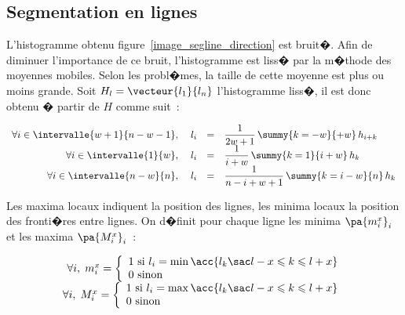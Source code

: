 \subsection{Segmentation en lignes}\label{section_segmentation_ligne}


L'histogramme obtenu figure~\ref{image_segline_direction} est bruit�. Afin de diminuer l'importance de ce bruit, l'histogramme est liss� par la m�thode des moyennes mobiles. Selon les probl�mes, la taille de cette moyenne est plus ou moins grande. Soit $H_l = \vecteur{l_1}{l_n}$ l'histogramme liss�, il est donc obtenu � partir de $H$ comme suit~:


            \begin{eqnarray}
            \begin{array}{rrcl}
            \forall i \in \intervalle{w+1}{n-w-1},     \; &     l_i &=& \dfrac{1}{2w+1} \, \summy{k=-w}{+w} \, h_{i+k} \\
            \forall i \in \intervalle{1}{w},                 \; &     l_i &=& \dfrac{1}{i+w} \, \summy{k=1}{i+w} \, h_k \\
            \forall i \in \intervalle{n-w}{n},             \; &     l_i &=& \dfrac{1}{n-i+ w + 1} \, \summy{k=i-w}{n} \, h_k 
            \end{array}
            \label{image_lissage_equation}
            \end{eqnarray}


Les maxima locaux indiquent la position des lignes, les minima locaux la position des fronti�res entre lignes. On d�finit pour chaque ligne les minima $\pa{m_i^x}_i$ et les maxima $\pa{M_i^x}_i$~:


            $$
            \begin{array}{rcl}
            \forall i, \; m_i^x = \left\{ \begin{array}{l}
                                                                        1 \text{ si } l_i = \min \acc { l_k \sac l-x \leqslant k \leqslant l+x } \\
                                                                        0 \text{ sinon}
                                                                    \end{array} \right. \\
            \forall i, \; M_i^x = \left\{ \begin{array}{l}
                                                                        1 \text{ si } l_i = \max \acc { l_k \sac l-x \leqslant k \leqslant l+x } \\
                                                                        0 \text{ sinon}
                                                                    \end{array} \right.
            \end{array}
            $$



